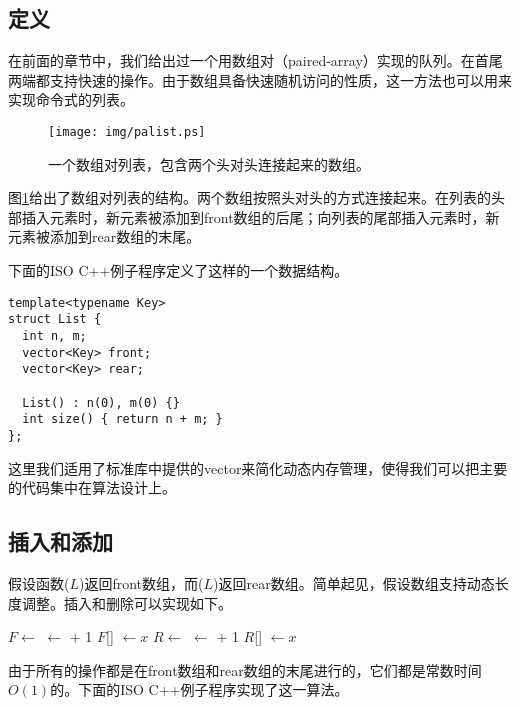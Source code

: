 \documentclass[UTF8]{article}
\begin{document}
\subsection{定义}
在前面的章节中，我们给出过一个用数组对（paired-array）实现的队列。在首尾两端都支持快速的操作。由于数组具备快速随机访问的性质，这一方法也可以用来实现命令式的列表。

\begin{figure}[htbp]
  \centering
  \texttt{[image: img/palist.ps]}
  \caption{一个数组对列表，包含两个头对头连接起来的数组。} \label{fig:palist}
\end{figure}

图\ref{fig:palist}给出了数组对列表的结构。两个数组按照头对头的方式连接起来。在列表的头部插入元素时，新元素被添加到front数组的后尾；向列表的尾部插入元素时，新元素被添加到rear数组的末尾。

下面的ISO C++例子程序定义了这样的一个数据结构。

\lstset{language=C++}
\begin{lstlisting}
template<typename Key>
struct List {
  int n, m;
  vector<Key> front;
  vector<Key> rear;

  List() : n(0), m(0) {}
  int size() { return n + m; }
};
\end{lstlisting}

这里我们适用了标准库中提供的vector来简化动态内存管理，使得我们可以把主要的代码集中在算法设计上。

\subsection{插入和添加}
假设函数($L$)返回front数组，而($L$)返回rear数组。简单起见，假设数组支持动态长度调整。插入和删除可以实现如下。

\begin{algorithmic}
  \State $F \gets $ 
  \State {} $\gets $  + 1
  \State $F$[] $\gets x$
\EndFunction
\Statex
{}
  \State $R \gets $ 
  \State {} $\gets $  + 1
  \State $R$[] $\gets x$
\EndFunction
\end{algorithmic}

由于所有的操作都是在front数组和rear数组的末尾进行的，它们都是常数时间$O(1)$的。下面的ISO C++例子程序实现了这一算法。
\end{document}
